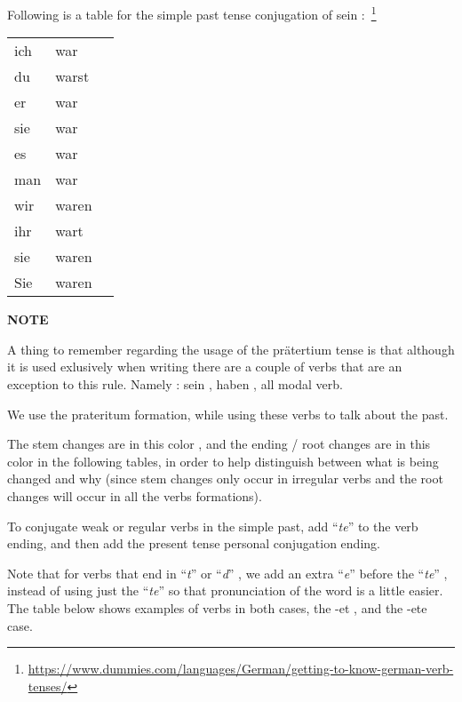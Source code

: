 \documentclass[a4paper,twocolumn,10pt]{article}
\newcommand{\newpar}
{\par \vspace{0.3cm}}
\newcommand{\tcolorboxstart}
{
	\nolinenumbers
	\vspace{0.2cm}
	\centering
}
\newcommand{\tcolorboxend}
{
	\justifying
	\vspace{0.2cm}
	\linenumbers
}
\newcommand{\tcolorboxnote}[1]
{

\tcolorboxstart
\begin{note-bg}

	\begin{note-theword}
		{\footnotesize \textbf{NOTE} }
	\end{note-theword}

	\begin{note-content} \justifying

		#1

	\end{note-content}

\end{note-bg}
\tcolorboxend
}
\newcommand{\tabularxtable}[3]
{

	\vspace{0.5cm}
	\nolinenumbers

	\begin{tabularx}{#1}{#2}
		#3
	\end{tabularx}

	\linenumbers
	\vspace{0.5cm}
}
\begin{document}
Following is a table for the simple past tense conjugation of sein :~\footnote{\url{https://www.dummies.com/languages/German/getting-to-know-german-verb-tenses/} }

\tabularxtable
{0.95\linewidth}
{llX}
{

ich & war  & \\
du  & warst  & \\
er  & war   & \\
sie & war   & \\
es  & war   & \\
man & war   & \\
wir & waren & \\
ihr & wart & \\
sie & waren & \\
Sie & waren & \\
}



\tcolorboxnote
{
A thing to remember regarding the usage of the prätertium tense is that although
it is used exlusively when writing there are a couple of verbs that are an
exception to this rule. Namely : sein , haben , all modal verb.\newpar

We use the prateritum formation, while using these verbs to talk about the past.

}




The stem changes are in \textcolor{red-flame}{this color} , and the ending /
root changes are in \textcolor{green-goethe}{this color} in the following
tables, in order to help distinguish between what is being changed and why
(since stem changes only occur in irregular verbs and the root changes will
occur in all the verbs formations).\newpar



To conjugate weak or regular verbs in the simple past, add ``{\textit{te}}'' to
the verb ending, and then add the present tense personal conjugation
ending.\newpar


Note that for verbs that end in ``{\textit{t}}'' or ``{\textit{d}}'' , we add an
extra ``{\textit{e}}'' before the 
``{\textit{te}}'' ,  instead of using just the ``{\textit{te}}'' so that
pronunciation of the word is a little easier. The table below shows examples of
verbs in both cases, the -et , and the -ete case.\newpar
\end{document}
